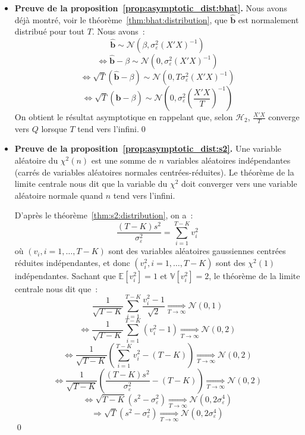 \documentclass[10pt,a4paper]{article}
\theoremstyle{definition}
\renewcommand{\newline}{\unskip\par\vspace{1.5pt}}
\begin{document}
\begin{notes}

  \begin{itemize}

  \item \textbf{Preuve de la proposition~\ref{prop:asymptotic_dist:bhat}.} Nous avons déjà montré, voir le théorème~\ref{thm:bhat:distribution}, que $\hat{\mathbf b}$ est normalement distribué pour tout $T$. Nous avons~:
    \[
      \hat{\mathbf b} \sim \mathcal N \left( \beta, \sigma_{\varepsilon}^2(X'X)^{-1}\right)
    \]
    \[
      \Leftrightarrow \hat{\mathbf b}-\beta \sim \mathcal N \left( 0, \sigma_{\varepsilon}^2(X'X)^{-1}\right)
    \]
    \[
      \Leftrightarrow \sqrt{T}\left( \hat{\mathbf b}-\beta \right) \sim \mathcal N \left( 0, T \sigma_{\varepsilon}^2(X'X)^{-1}\right)
    \]
    \[
      \Leftrightarrow \sqrt{T}\left( \hat{\mathbf b}-\beta \right) \sim \mathcal N \left( 0, \sigma_{\varepsilon}^2\left( \frac{X'X}{T} \right)^{-1}\right)
    \]
    On obtient le résultat asymptotique en rappelant que, selon $\mathcal H_2$, $\frac{X'X}{T}$ converge vers $Q$ lorsque $T$ tend vers l'infini.\qed\newline

  \item \textbf{Preuve de la proposition~\ref{prop:asymptotic_dist:s2}.} Une variable aléatoire du $\chi^2(n)$ est une somme de $n$ variables aléatoires indépendantes (carrés de variables aléatoires normales centrées-réduites). Le théorème de la limite centrale nous dit que la variable du $\chi^2$ doit converger vers une variable aléatoire normale quand $n$ tend vers l'infini.\newline

    D'après le théorème~\ref{thm:s2:distribution}, on a~:
    \[
      \frac{(T-K)s^2}{\sigma_{\varepsilon}^2} = \sum_{i=1}^{T-K}v_i^2
    \]
    où $(v_i, i=1,\dots,T-K)$ sont des variables aléatoires gaussiennes centrées réduites indépendantes, et donc $(v_i^2, i=1,\dots,T-K)$ sont des $\chi^2(1)$ indépendantes. Sachant que $\mathbb E\left[ v_i^2 \right]=1$ et $\mathbb V\left[ v_i^2 \right]=2$, le théorème de la limite centrale nous dit que~:
    \[
      \frac{1}{\sqrt{T-K}}\sum_{i=1}^{T-K}\frac{v_i^2-1}{\sqrt{2}} \underset{T\to\infty}{\Longrightarrow} \mathcal N(0,1)
    \]
    \[
      \Leftrightarrow \frac{1}{\sqrt{T-K}}\sum_{i=1}^{T-K} \left( v_i^2-1 \right) \underset{T\to\infty}{\Longrightarrow} \mathcal N(0,2)
    \]
    \[
      \Leftrightarrow \frac{1}{\sqrt{T-K}}\left( \sum_{i=1}^{T-K}v_i^2 - (T-K) \right) \underset{T\to\infty}{\Longrightarrow} \mathcal N(0,2)
    \]
    \[
      \Leftrightarrow \frac{1}{\sqrt{T-K}}\left( \frac{(T-K)s^2}{\sigma_{\varepsilon}^2} - (T-K) \right) \underset{T\to\infty}{\Longrightarrow} \mathcal N(0,2)
    \]
    \[
      \Leftrightarrow \sqrt{T-K}\left( s^2 - \sigma_{\varepsilon}^2 \right) \underset{T\to\infty}{\Longrightarrow} \mathcal N\left(0,2\sigma_{\varepsilon}^4 \right)
    \]
    \[
      \Rightarrow \sqrt{T}\left( s^2 - \sigma_{\varepsilon}^2 \right) \underset{T\to\infty}{\Longrightarrow} \mathcal N\left(0,2\sigma_{\varepsilon}^4 \right)
    \]
    \qed
  \end{itemize}

\end{notes}
\end{document}
